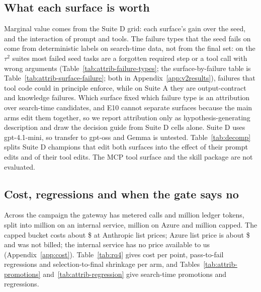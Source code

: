 \subsection{What each surface is worth}
\label{sec:v2:types}

Marginal value comes from the Suite D grid: each surface's gain over the seed, and the interaction of prompt and tools.  The failure types that the seed fails on come from deterministic labels on search-time data, not from the final set: on the $\tau^2$ suites most failed seed tasks are a forgotten required step or a tool call with wrong arguments (Table~\ref{tab:attrib-failure-types}; the surface-by-failure table is Table~\ref{tab:attrib-surface-failure}; both in Appendix~\ref{app:v2results}), failures that tool code could in principle enforce, while on Suite A they are output-contract and knowledge failures. Which surface fixed which failure type is an attribution over search-time candidates, and E10 cannot separate surfaces because the main arms edit them together, so we report attribution only as hypothesis-generating description and draw the decision guide from Suite D cells alone. Suite D uses gpt-4.1-mini, so transfer to gpt-oss and Gemma is untested. Table~\ref{tab:decomp} splits Suite D champions that edit both surfaces into the effect of their prompt edits and of their tool edits.  The MCP tool surface and the skill package are not evaluated.

\subsection{Cost, regressions and when the gate says no}
\label{sec:v2:cost}

Across the campaign the gateway has metered \costCalls{} calls and \costLedgerM{} million ledger tokens, split into \costRitsM{} million on an internal service, \costAzureM{} million on Azure and \costCappedM{} million capped. The capped bucket costs about \$\costUsdCapped{} at Anthropic list prices; Azure list price is about \$\costUsdAzure{} and was not billed; the internal service has no price available to us (Appendix~\ref{app:cost}). Table~\ref{tab:rq4} gives cost per point, pass-to-fail regressions and selection-to-final shrinkage per arm, and Tables~\ref{tab:attrib-promotions} and~\ref{tab:attrib-regression} give search-time promotions and regressions. 
